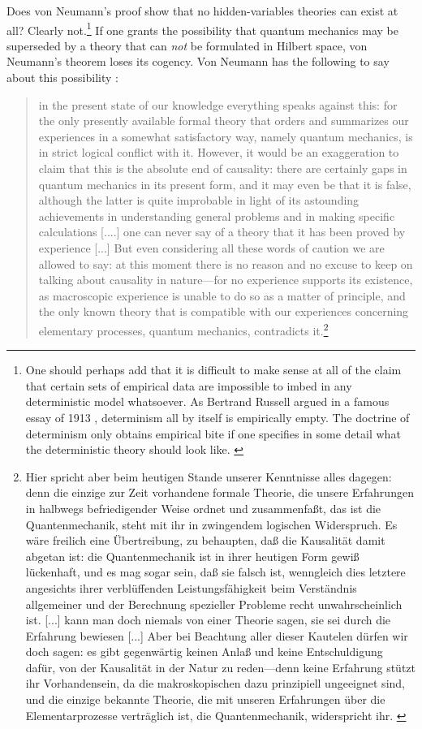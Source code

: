\documentclass[11pt]{article}
\begin{document}
Does von Neumann's proof show that no hidden-variables theories can exist at all? Clearly not.\footnote{One should perhaps add that it is difficult to make sense at all of the claim that certain sets of empirical data are impossible to imbed in any deterministic model whatsoever. As Bertrand Russell argued in a famous essay of 1913 \cite{russell}, determinism all by itself is empirically empty. The doctrine of determinism only obtains empirical bite if one specifies in some detail what the deterministic theory should look like. \label{Noteunderdet}} If one grants the possibility that quantum mechanics may be superseded by a theory that can \emph{not} be formulated in Hilbert space, von Neumann's theorem loses its cogency. Von Neumann has the following to say about this possibility \cite[p.\@ 173]{VN1}:
\begin{quote}
  in the present state of our knowledge everything speaks against this: for the only presently available formal theory that orders and summarizes our experiences in a somewhat satisfactory way, namely quantum mechanics, is in strict logical conflict with it. However, it would be an exaggeration to claim that this is the absolute end of causality: there are certainly gaps in quantum mechanics in its present form, and it may even be that it is false, although the latter is quite improbable in light of its astounding achievements in understanding general problems and in making specific calculations [....] one can never say of a theory that it has been proved by experience [...] But even considering all these words of caution we are allowed to say: at this moment there is no reason and no excuse to keep on talking about causality in nature---for no experience supports its existence, as macroscopic experience is unable to do so as a matter of principle, and the only known theory that is compatible with our experiences concerning elementary processes, quantum mechanics, contradicts it.\footnote{Hier spricht aber beim heutigen Stande unserer Kenntnisse alles dagegen: denn die einzige zur Zeit vorhandene formale Theorie, die unsere Erfahrungen in halbwegs befriedigender Weise ordnet und zusammenfa{\ss}t, das ist die Quantenmechanik, steht mit ihr in zwingendem logischen Widerspruch. Es w\"{a}re freilich eine \"{U}bertreibung, zu behaupten, da{\ss} die Kausalit\"{a}t damit abgetan ist: die Quantenmechanik ist in ihrer heutigen Form gewi{\ss} l\"{u}ckenhaft, und es mag sogar sein, da{\ss} sie falsch ist, wenngleich dies letztere angesichts ihrer verbl\"{u}ffenden Leistungsf\"{a}higkeit beim Verst\"{a}ndnis allgemeiner und der Berechnung spezieller Probleme recht unwahrscheinlich ist. [...] kann man doch niemals von einer Theorie sagen, sie sei durch die Erfahrung bewiesen [...] Aber bei Beachtung aller dieser Kautelen d\"{u}rfen wir doch sagen: es gibt gegenw\"{a}rtig keinen Anla{\ss} und keine Entschuldigung daf\"{u}r, von der Kausalit\"{a}t in der Natur zu reden---denn keine Erfahrung st\"{u}tzt ihr Vorhandensein, da die makroskopischen dazu prinzipiell ungeeignet sind, und die einzige bekannte Theorie, die mit unseren Erfahrungen \"{u}ber die Elementarprozesse vertr\"{a}glich ist, die Quantenmechanik, widerspricht ihr. \label{notevN}}
\end{quote}
\end{document}
